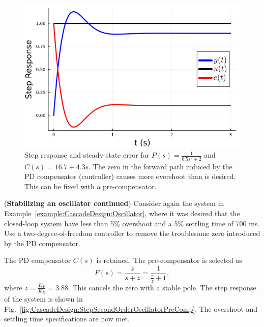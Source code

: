 \begin{figure}[bt]
      \centering
      \includegraphics[width = .4\linewidth]{graphics/Chap10/StepSecondOrderOscillator.png}
    \caption[]{Step response and steady-state error for $P(s)=\frac{1}{0.5s^2+2}$ and $C(s)=16.7 + 4.3s$. The zero in the forward path induced by the PD compensator (controller) causes more overshoot than is desired. This can be fixed with a pre-compensator. }
    \label{fig:CascadeDesign:StepSecondOrderOscillator}
  \end{figure}





\bigskip
{}

\begin{example}(\textbf{Stabilizing an oscillator continued})
\label{example:CascadeDesign:OscillatorContinued}
Consider again the system in Example~\ref{example:CascadeDesign:Oscillator}, where it was desired that the closed-loop system have less than 5\% overshoot and a 5\% settling time of 700 ms. Use a two-degree-of-freedom controller to remove the troublesome zero introduced by the PD compensator.
    
\end{example}  

\solution The PD compensator $C(s)$ is retained. The pre-compensator is selected as
\begin{equation}
    \label{eq:PrecompensatorPoleToCancelPDzero}
    F(s)= \frac{z}{s+z} = \frac{1}{\frac{s}{z} + 1},
\end{equation}
where $z=\frac{K_P}{K_D} = 3.88.$ This cancels the zero with a stable pole. The step response of the system is shown in Fig.~\ref{fig:CascadeDesign:StepSecondOrderOscillatorPreComp}. The overshoot and settling time specifications are now met.

